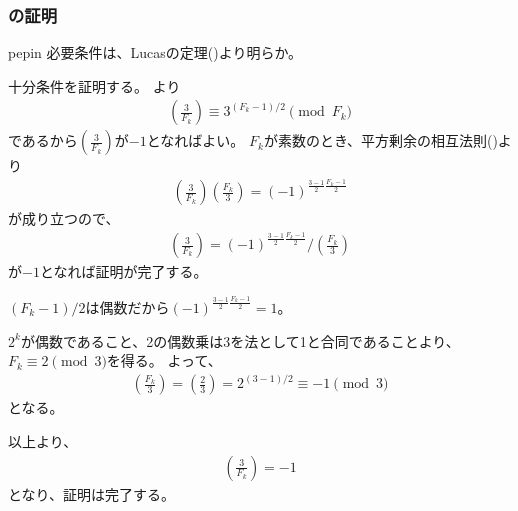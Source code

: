 \subsubsection{の証明}
\begin{thProof}{pepin}
必要条件は、Lucasの定理()より明らか。

十分条件を証明する。
より
\begin{align*}
\left(\frac{3}{F_k}\right) \equiv 3^{(F_k-1)/2} \pmod{F_k}
\end{align*}
であるから$\left(\frac{3}{F_k}\right)$が$-1$となればよい。
$F_k$が素数のとき、平方剰余の相互法則()より
\begin{align*}
\left(\frac{3}{F_k}\right)\left(\frac{F_k}{3}\right) = (-1)^{\frac{3-1}{2}\frac{F_k-1}{2}}
\end{align*}
が成り立つので、
\begin{align*}
\left(\frac{3}{F_k}\right) = (-1)^{\frac{3-1}{2}\frac{F_k-1}{2}} \bigg/ \left(\frac{F_k}{3}\right)
\end{align*}
が$-1$となれば証明が完了する。

$(F_k-1)/2$は偶数だから$(-1)^{\frac{3-1}{2}\frac{F_k-1}{2}}=1$。

$2^k$が偶数であること、2の偶数乗は3を法として1と合同であることより、$F_k\equiv2\pmod{3}$を得る。
よって、
\begin{align*}
\left(\frac{F_k}{3}\right) = \left(\frac{2}{3}\right) = 2^{(3-1)/2} \equiv -1 \pmod{3}
\end{align*}
となる。

以上より、
\begin{align*}
\left(\frac{3}{F_k}\right) = -1
\end{align*}
となり、証明は完了する。
\end{thProof}
